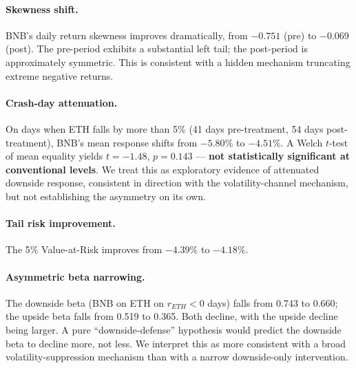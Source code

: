 \documentclass[11pt,a4paper]{article}
\begin{document}
\paragraph{Skewness shift.} BNB's daily return skewness improves dramatically, from $-0.751$ (pre) to $-0.069$ (post). The pre-period exhibits a substantial left tail; the post-period is approximately symmetric. This is consistent with a hidden mechanism truncating extreme negative returns.

\paragraph{Crash-day attenuation.} On days when ETH falls by more than 5\% (41 days pre-treatment, 54 days post-treatment), BNB's mean response shifts from $-5.80\%$ to $-4.51\%$. A Welch $t$-test of mean equality yields $t=-1.48$, $p=0.143$ --- \textbf{not statistically significant at conventional levels}. We treat this as exploratory evidence of attenuated downside response, consistent in direction with the volatility-channel mechanism, but not establishing the asymmetry on its own.

\paragraph{Tail risk improvement.} The 5\% Value-at-Risk improves from $-4.39\%$ to $-4.18\%$.

\paragraph{Asymmetric beta narrowing.} The downside beta (BNB on ETH on $r_{ETH}<0$ days) falls from 0.743 to 0.660; the upside beta falls from 0.519 to 0.365. Both decline, with the upside decline being larger. A pure ``downside-defense'' hypothesis would predict the downside beta to decline more, not less. We interpret this as more consistent with a broad volatility-suppression mechanism than with a narrow downside-only intervention.
\end{document}

